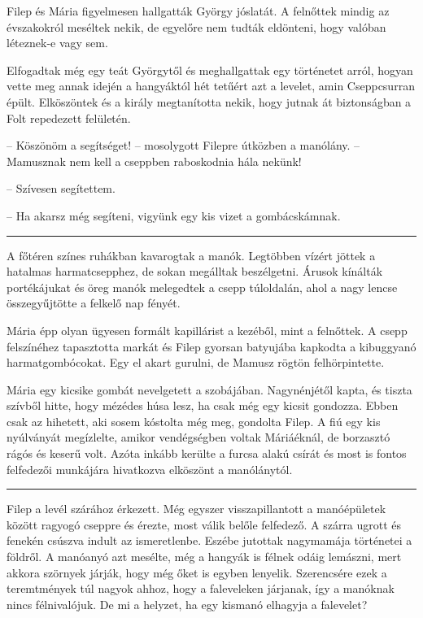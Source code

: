 \documentclass[10pt]{memoir}
\renewcommand{\pfbreakdisplay}{\bigskip \ding{166} \bigskip}
\newcommand{\secbreak}{\fancybreak{\pfbreakdisplay}\indent}
\begin{document}
Filep és Mária figyelmesen hallgatták György jóslatát. A felnőttek mindig az
évszakokról meséltek nekik, de egyelőre nem tudták eldönteni, hogy valóban
léteznek-e vagy sem.

Elfogadtak még egy teát Györgytől és meghallgattak egy történetet arról, hogyan
vette meg annak idején a hangyáktól hét tetűért azt a levelet, amin
Cseppcsurran épült. Elköszöntek és a király megtanította nekik, hogy jutnak át
biztonságban a Folt repedezett felületén.

-- Köszönöm a segítséget! -- mosolygott Filepre útközben a manólány. --
Mamusznak nem kell a cseppben raboskodnia hála nekünk!

-- Szívesen segítettem.

-- Ha akarsz még segíteni, vigyünk egy kis vizet a gombácskámnak.

\secbreak

A főtéren színes ruhákban kavarogtak a manók. Legtöbben vízért jöttek a
hatalmas harmatcsepphez, de sokan megálltak beszélgetni. Árusok kínálták
portékájukat és öreg manók melegedtek a csepp túloldalán, ahol a nagy lencse
összegyűjtötte a felkelő nap fényét.

Mária épp olyan ügyesen formált kapillárist a kezéből, mint a felnőttek. A
csepp felszínéhez tapasztotta markát és Filep gyorsan batyujába kapkodta a
kibuggyanó harmatgombócokat. Egy el akart gurulni, de Mamusz rögtön
felhörpintette.

Mária egy kicsike gombát nevelgetett a szobájában. Nagynénjétől kapta, és
tiszta szívből hitte, hogy mézédes húsa lesz, ha csak még egy kicsit gondozza.
Ebben csak az hihetett, aki sosem kóstolta még meg, gondolta Filep. A fiú egy
kis nyúlványát megízlelte, amikor vendégségben voltak Máriáéknál, de borzasztó
rágós és keserű volt. Azóta inkább kerülte a furcsa alakú csírát és most is
fontos felfedezői munkájára hivatkozva elköszönt a manólánytól.

\secbreak

Filep a levél szárához érkezett. Még egyszer visszapillantott a manóépületek
között ragyogó cseppre és érezte, most válik belőle felfedező. A szárra ugrott
és fenekén csúszva indult az ismeretlenbe. Eszébe jutottak nagymamája
történetei a földről. A manóanyó azt mesélte, még a hangyák is félnek odáig
lemászni, mert akkora szörnyek járják, hogy még őket is egyben lenyelik.
Szerencsére ezek a teremtmények túl nagyok ahhoz, hogy a faleveleken járjanak,
így a manóknak nincs félnivalójuk. De mi a helyzet, ha egy kismanó elhagyja a
falevelet?
\end{document}
